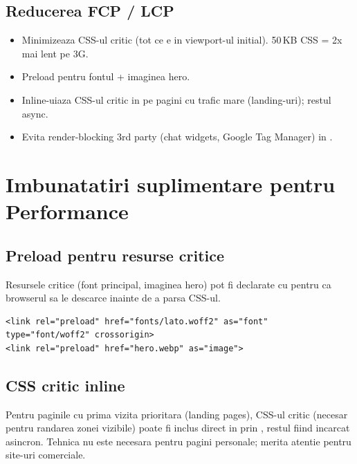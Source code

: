 \subsection{Reducerea FCP / LCP}

\begin{itemize}[itemsep=1pt]
  \item Minimizeaza CSS-ul critic (tot ce e in viewport-ul initial). 50\,KB CSS = 2x mai lent pe 3G.
  \item Preload pentru fontul + imaginea hero.
  \item Inline-uiaza CSS-ul critic in  pe pagini cu trafic mare (landing-uri); restul  async.
  \item Evita render-blocking 3rd party (chat widgets, Google Tag Manager) in .
\end{itemize}

\section{Imbunatatiri suplimentare pentru Performance}

\subsection{Preload pentru resurse critice}

Resursele critice (font principal, imaginea hero) pot fi declarate cu  pentru ca browserul sa le descarce inainte de a parsa CSS-ul.

\begin{lstlisting}[style=html]
<link rel="preload" href="fonts/lato.woff2" as="font" type="font/woff2" crossorigin>
<link rel="preload" href="hero.webp" as="image">
\end{lstlisting}

\subsection{CSS critic inline}

Pentru paginile cu prima vizita prioritara (landing pages), CSS-ul critic (necesar pentru randarea zonei vizibile) poate fi inclus direct in  prin , restul fiind incarcat asincron. Tehnica nu este necesara pentru pagini personale; merita atentie pentru site-uri comerciale.

